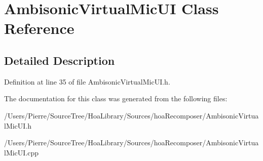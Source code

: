 \hypertarget{class_ambisonic_virtual_mic_u_i}{\section{Ambisonic\-Virtual\-Mic\-U\-I Class Reference}
\label{class_ambisonic_virtual_mic_u_i}
}


\subsection{Detailed Description}


Definition at line 35 of file Ambisonic\-Virtual\-Mic\-U\-I.\-h.



The documentation for this class was generated from the following files\-:\begin{DoxyCompactItemize}
\item 
/\-Users/\-Pierre/\-Source\-Tree/\-Hoa\-Library/\-Sources/hoa\-Recomposer/Ambisonic\-Virtual\-Mic\-U\-I.\-h\item 
/\-Users/\-Pierre/\-Source\-Tree/\-Hoa\-Library/\-Sources/hoa\-Recomposer/Ambisonic\-Virtual\-Mic\-U\-I.\-cpp\end{DoxyCompactItemize}
